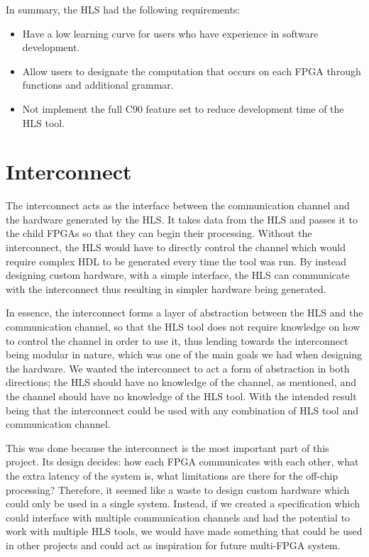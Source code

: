 In summary, the HLS had the following requirements:

\begin{itemize}
    \item Have a low learning curve for users who have experience in software development.
    \item Allow users to designate the computation that occurs on each FPGA through functions and additional grammar.
    \item Not implement the full C90 feature set to reduce development time of the HLS tool.
\end{itemize}

\section{Interconnect}
\label{sec:interconnect_design}

The interconnect acts as the interface between the communication channel and the hardware generated by the HLS. It takes data from the HLS and passes it to the child FPGAs so that they can begin their processing. Without the interconnect, the HLS would have to directly control the channel which would require complex HDL to be generated every time the tool was run. By instead designing custom hardware, with a simple interface, the HLS can communicate with the interconnect thus resulting in simpler hardware being generated.

In essence, the interconnect forms a layer of abstraction between the HLS and the communication channel, so that the HLS tool does not require knowledge on how to control the channel in order to use it, thus lending towards the interconnect being modular in nature, which was one of the main goals we had when designing the hardware. We wanted the interconnect to act a form of abstraction in both directions; the HLS should have no knowledge of the channel, as mentioned, and the channel should have no knowledge of the HLS tool. With the intended result being that the interconnect could be used with any combination of HLS tool and communication channel.

This was done because the interconnect is the most important part of this project. Its design decides: how each FPGA communicates with each other, what the extra latency of the system is, what limitations are there for the off-chip processing? Therefore, it seemed like a waste to design custom hardware which could only be used in a single system. Instead, if we created a specification which could interface with multiple communication channels and had the potential to work with multiple HLS tools, we would have made something that could be used in other projects and could act as inspiration for future multi-FPGA system.

